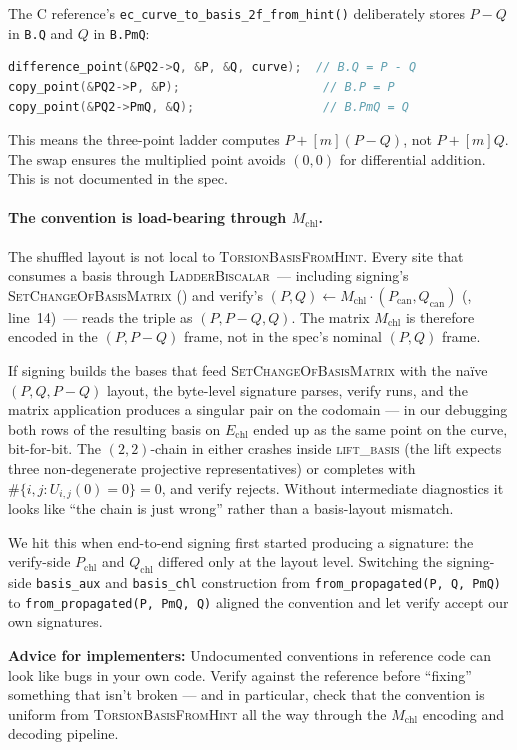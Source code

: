 The C reference's \texttt{ec\_curve\_to\_basis\_2f\_from\_hint()}
deliberately stores $P-Q$ in \texttt{B.Q} and $Q$ in
\texttt{B.PmQ}:
\begin{lstlisting}[language=C]
difference_point(&PQ2->Q, &P, &Q, curve);  // B.Q = P - Q
copy_point(&PQ2->P, &P);                    // B.P = P
copy_point(&PQ2->PmQ, &Q);                  // B.PmQ = Q
\end{lstlisting}
This means the three-point ladder computes $P + [m](P-Q)$, not
$P + [m]Q$.  The swap ensures the multiplied point avoids $(0,0)$
for differential addition.  This is not documented in the spec.

\paragraph{The convention is load-bearing through $M_{\mathrm{chl}}$.}
The shuffled layout is not local to
\textsc{TorsionBasisFromHint}.  Every site that consumes a basis
through \textsc{LadderBiscalar}~--- including signing's
\textsc{SetChangeOfBasisMatrix} () and verify's
$(P, Q) \leftarrow M_{\mathrm{chl}} \cdot (P_{\mathrm{can}},
Q_{\mathrm{can}})$ (, line~14)~--- reads the triple as
$(P, P{-}Q, Q)$.  The matrix $M_{\mathrm{chl}}$ is therefore encoded
in the $(P, P{-}Q)$ frame, not in the spec's nominal $(P, Q)$ frame.

If signing builds the bases that feed
\textsc{SetChangeOfBasisMatrix} with the naïve $(P, Q, P{-}Q)$
layout, the byte-level signature parses, verify runs, and the
matrix application produces a singular pair on the codomain ---
in our debugging both rows of the resulting basis on $E_{\mathrm{chl}}$
ended up as the same point on the curve, bit-for-bit.  The
$(2,2)$-chain in  either crashes inside
\textsc{lift\_basis} (the lift expects three non-degenerate
projective representatives) or completes with
$\#\{i, j : U_{i, j}(0) = 0\} = 0$, and verify rejects.  Without
intermediate diagnostics it looks like ``the chain is just wrong''
rather than a basis-layout mismatch.

We hit this when end-to-end signing first started producing a
signature: the verify-side $P_{\mathrm{chl}}$ and $Q_{\mathrm{chl}}$
differed only at the layout level.  Switching the signing-side
\texttt{basis\_aux} and \texttt{basis\_chl} construction from
\texttt{from\_propagated(P, Q, PmQ)} to
\texttt{from\_propagated(P, PmQ, Q)} aligned the convention and
let verify accept our own signatures.

\noindent
\textbf{Advice for implementers:} Undocumented conventions in
reference code can look like bugs in your own code.  Verify against
the reference before ``fixing'' something that isn't broken --- and
in particular, check that the convention is uniform from
\textsc{TorsionBasisFromHint} all the way through the
$M_{\mathrm{chl}}$ encoding and decoding pipeline.


